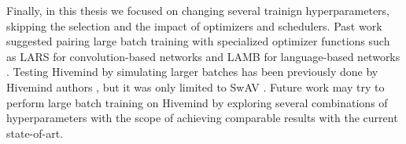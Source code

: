 Finally, in this thesis we focused on changing several trainign hyperparameters, skipping the selection and the impact of optimizers and schedulers.
Past work suggested pairing large batch training with specialized optimizer functions such as LARS for convolution-based networks \cite{you2017scaling, DBLP:journals/corr/KeskarMNST16} and LAMB for language-based networks \cite{DBLP:journals/corr/abs-1904-00962}.
Testing Hivemind by simulating larger batches has been previously done by Hivemind authors \cite{DBLP:journals/corr/abs-2106-10207}, but it was only limited to SwAV \cite{DBLP:journals/corr/abs-2006-09882}.
Future work may try to perform large batch training on Hivemind by exploring several combinations of hyperparameters with the scope of achieving comparable results with the current state-of-art.
